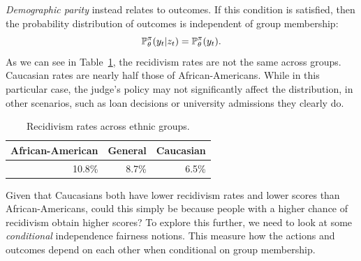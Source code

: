 \documentclass{beamer}
\begin{document}
\begin{frame}
{    \emph{Demographic parity} instead relates to outcomes. If this
    condition is satisfied, then the probability distribution of
    outcomes is independent of group membership:
    \begin{equation}
      \label{eq:eqality-outcomes}
      \mathop{\mbox{\ensuremath{\mathbb{P}}}}\nolimits_\theta^\pi(y_t | z_t) =       \mathop{\mbox{\ensuremath{\mathbb{P}}}}\nolimits_\theta^\pi(y_t ).
    \end{equation}
    As we can see in Table~\ref{tab:recidivism}, the recidivism rates are not the same across groups. Caucasian rates are nearly half those of African-Americans. While in this particular case, the judge's policy may not significantly affect the distribution, in other scenarios, such as loan decisions or university admissions they clearly do. 
    \begin{table}[h]
      \centering
      \begin{tabular}{r|r|r}
        African-American& General & Caucasian\\
        \hline
        10.8\% & 8.7\% & 6.5\% 
      \end{tabular}
      \label{tab:recidivism}
      \caption{Recidivism rates across ethnic groups.}
    \end{table}
    Given that Caucasians both have lower recidivism rates and lower scores than African-Americans, could this simply be because people with a higher chance of recidivism obtain higher scores? To explore this further, we need to look at some \emph{conditional} independence fairness notions. This measure how the actions and outcomes depend on each other when conditional on group membership.
  }
\end{frame}
\end{document}
